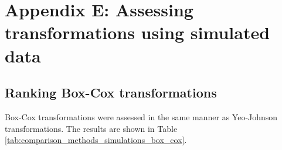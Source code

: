 \documentclass[
  a4paper,
]{article}
\begin{document}
\FloatBarrier

\section{Appendix E: Assessing transformations using simulated
data}\label{appendix-e-assessing-transformations-using-simulated-data}

\subsection{Ranking Box-Cox
transformations}\label{ranking-box-cox-transformations}

Box-Cox transformations were assessed in the same manner as Yeo-Johnson
transformations. The results are shown in Table
\ref{tab:comparison_methods_simulations_box_cox}.
\end{document}
